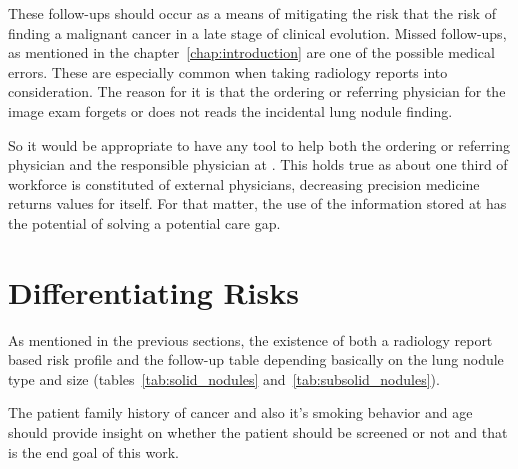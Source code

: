 These follow-ups should occur as a  means of mitigating the risk that the risk of finding a malignant cancer in a late stage of clinical evolution. Missed follow-ups, as mentioned in  the chapter~\ref{chap:introduction} are one of the possible medical errors. These are especially common when taking radiology reports into consideration. The reason for it is that the ordering or referring physician for the image exam forgets or does not reads the incidental lung nodule finding. 

So it would be appropriate to have any tool to help both the ordering or referring physician and the responsible physician at \nomeHsl{}. This holds true as about one third of \nomeHslShort{} workforce is constituted of external physicians, decreasing precision medicine returns values for itself. For that matter, the use of the information stored at \nomeHslShort{} has the potential of solving a potential care gap. 

\section{Differentiating Risks}

As mentioned in the previous sections, the existence of both a radiology report based risk profile and the follow-up table depending basically on the lung nodule type and  size (tables~\ref{tab:solid_nodules} and~\ref{tab:subsolid_nodules}). 

The patient family history of cancer and also it's smoking behavior and age should provide insight on whether the patient should be screened or not and that is the end goal of this work.


